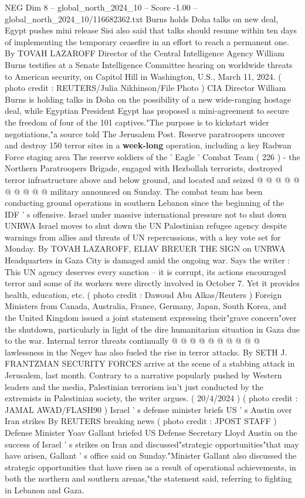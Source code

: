 \begin{textsample}{NEG Dim 8 – global\_north\_2024\_10 – Score -1.00 – global\_north\_2024\_10/116682362.txt}  \label{ex:f8_neg_200}
Burns holds Doha talks on new deal, Egypt pushes mini release Sisi also said that talks should resume within ten days of implementing the temporary ceasefire in an effort to reach a permanent one.
By TOVAH LAZAROFF Director of the Central Intelligence Agency William Burns testifies at a Senate Intelligence Committee hearing on worldwide threats to American security, on Capitol Hill in Washington, U.S., March 11, 2024. ( photo credit : REUTERS/Julia Nikhinson/File Photo ) CIA Director William Burns is holding talks in Doha on the possibility of a new wide-ranging hostage deal, while Egyptian President Egypt has proposed a mini-agreement to secure the freedom of four of the 101 captives."The purpose is to kickstart wider negotiations,"a source told The Jerusalem Post.
Reserve paratroopers uncover and destroy 150 terror sites in a \textbf{week-long} operation, including a key Radwan Force staging area The reserve soldiers of the ' Eagle ' Combat Team ( 226 ) - the Northern Paratroopers Brigade, engaged with Hezbollah terrorists, destroyed terror infrastructure above and below ground, and located and seized @ @ @ @ @ @ @ @ @ @ military announced on Sunday.
The combat team has been conducting ground operations in southern Lebanon since the beginning of the IDF ' s offensive.
Israel under massive international pressure not to shut down UNRWA Israel moves to shut down the UN Palestinian refugee agency despite warnings from allies and threats of UN repercussions, with a key vote set for Monday.
By TOVAH LAZAROFF, ELIAV BREUER THE SIGN on UNRWA Headquarters in Gaza City is damaged amid the ongoing war.
Says the writer : This UN agency deserves every sanction -- it is corrupt, its actions encouraged terror and some of its workers were directly involved in October 7.
Yet it provides health, education, etc. ( photo credit : Dawoud Abu Alkas/Reuters ) Foreign Ministers from Canada, Australia, France, Germany, Japan, South Korea, and the United Kingdom issued a joint statement expressing their"grave concern"over the shutdown, particularly in light of the dire humanitarian situation in Gaza due to the war.
Internal terror threats continually @ @ @ @ @ @ @ @ @ @ lawlessness in the Negev has also fueled the rise in terror attacks.
By SETH J.
FRANTZMAN SECURITY FORCES arrive at the scene of a stabbing attack in Jerusalem, last month.
Contrary to a narrative popularly pushed by Western leaders and the media, Palestinian terrorism isn't just conducted by the extremists in Palestinian society, the writer argues. ( 20/4/2024 ) ( photo credit : JAMAL AWAD/FLASH90 ) Israel ' s defense minister briefs US ' s Austin over Iran strikes By REUTERS breaking news ( photo credit : JPOST STAFF ) Defense Minister Yoav Gallant briefed US Defense Secretary Lloyd Austin on the success of Israel ' s strikes on Iran and discussed"strategic opportunities"that may have arisen, Gallant ' s office said on Sunday."Minister Gallant also discussed the strategic opportunities that have risen as a result of operational achievements, in both the northern and southern arenas,"the statement said, referring to fighting in Lebanon and Gaza.

\end{textsample}
